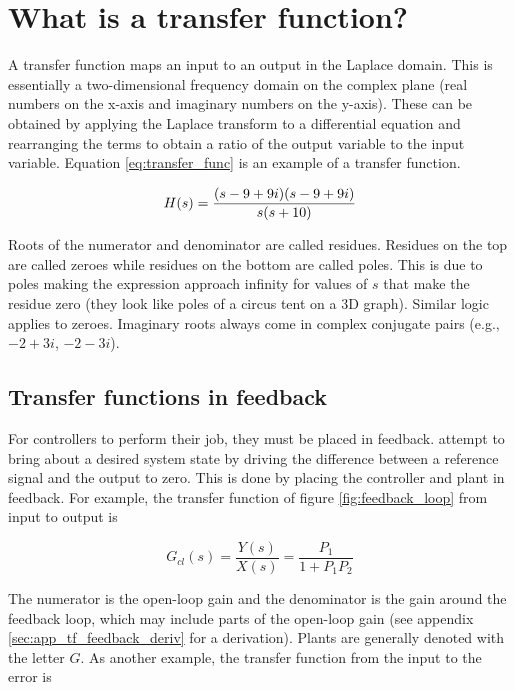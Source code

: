 \documentclass[10pt,conference,compsoc]{IEEEtran}
\begin{document}
\section{What is a transfer function?}

\noindent A transfer function maps an input to an output in the Laplace domain.
This is essentially a two-dimensional frequency domain on the complex plane
(real numbers on the x-axis and imaginary numbers on the y-axis). These can be
obtained by applying the Laplace transform to a differential equation and
rearranging the terms to obtain a ratio of the output variable to the input
variable. Equation \ref{eq:transfer_func} is an example of a transfer function.

\begin{equation} \label{eq:transfer_func}
  H(s) = \frac{(s-9+9i)(s-9+9i)}{s(s+10)} \\
\end{equation}

\noindent Roots of the numerator and denominator are called residues. Residues
on the top are called zeroes while residues on the bottom are called poles. This
is due to poles making the expression approach infinity for values of $s$ that
make the residue zero (they look like poles of a circus tent on a 3D graph).
Similar logic applies to zeroes. Imaginary roots always come in complex
conjugate pairs (e.g., $-2 + 3i$, $-2 - 3i$).

\subsection{Transfer functions in feedback}

\noindent For \glspl{controller} to perform their job, they must be placed in
feedback. attempt to bring about a desired \gls{system} state by
driving the difference between a \gls{reference} signal and the \gls{output} to
zero. This is done by placing the controller and \gls{plant} in feedback. For
example, the transfer function of figure \ref{fig:feedback_loop} from input to
output is

\begin{equation}
  G_{cl}(s) = \frac{Y(s)}{X(s)} = \frac{P_1}{1 + P_1 P_2}
\end{equation}

\noindent The numerator is the \gls{open-loop gain} and the denominator is the
gain around the feedback loop, which may include parts of the
\gls{open-loop gain} (see appendix \ref{sec:app_tf_feedback_deriv} for a
derivation). Plants are generally denoted with the letter $G$. As another
example, the transfer function from the input to the error is
\end{document}
